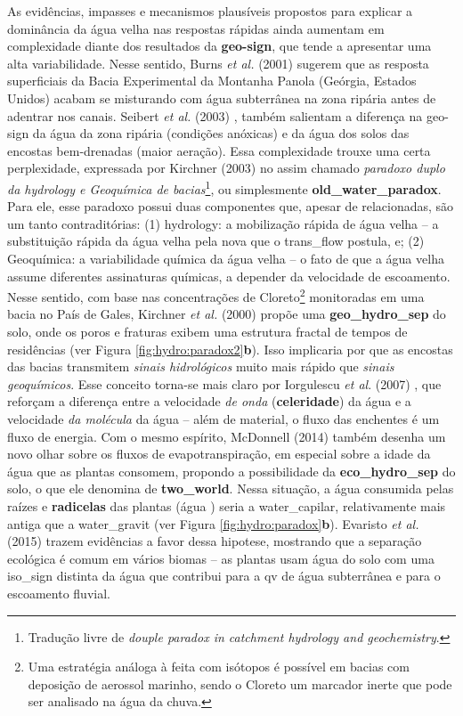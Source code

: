 \documentclass[./main.tex]{subfiles}
\begin{document}
\par As evidências, impasses e mecanismos plausíveis propostos para explicar a dominância da água velha nas respostas rápidas ainda aumentam em complexidade diante dos resultados da \textbf{\gls{geo-sign}}, que tende a apresentar uma alta variabilidade. Nesse sentido, Burns \textit{et al.} (2001) \cite{burns2001quantifying} sugerem que as resposta superficiais da Bacia Experimental da Montanha Panola (Geórgia, Estados Unidos) acabam se misturando com água subterrânea na zona ripária antes de adentrar nos canais. Seibert \textit{et al.} (2003) \cite{seibert2003groundwater}, também salientam a diferença na \gls{geo-sign} da água da zona ripária (condições anóxicas) e da água dos solos das encostas bem-drenadas (maior aeração). Essa complexidade trouxe uma certa perplexidade, expressada por Kirchner (2003) \cite{Kirchner2003} no assim chamado \textit{paradoxo duplo da \gls{hydrology} e Geoquímica de bacias}\footnote{Tradução livre de \textit{douple paradox in catchment hydrology and geochemistry}.}, ou simplesmente \textbf{\gls{old_water_paradox}}. Para ele, esse paradoxo possui duas componentes que, apesar de relacionadas, são um tanto contraditórias: (1) \gls{hydrology}: a mobilização rápida de água velha -- a substituição rápida da água velha pela nova que o \gls{trans_flow} postula, e; (2) Geoquímica: a variabilidade química da água velha -- o fato de que a água velha assume diferentes assinaturas químicas, a depender da velocidade de escoamento. Nesse sentido, com base nas concentrações de Cloreto\footnote{Uma estratégia análoga à feita com isótopos é possível em bacias com deposição de aerossol marinho, sendo o Cloreto um marcador inerte que pode ser analisado na água da chuva.} monitoradas em uma bacia no País de Gales, Kirchner \textit{et al.} (2000) \cite{kirchner2000} propõe uma \textbf{\gls{geo_hydro_sep}} do solo, onde os poros e fraturas exibem uma estrutura fractal de tempos de residências (ver Figura \ref{fig:hydro:paradox2}\textbf{b}). Isso implicaria por que as encostas das bacias transmitem \textit{sinais hidrológicos} muito mais rápido que \textit{sinais geoquímicos}. Esse conceito torna-se mais claro por Iorgulescu \textit{et al}. (2007) \cite{Iorgulescu2007}, que reforçam a diferença entre a velocidade \textit{de onda} (\textbf{celeridade}) da água e a velocidade \textit{da molécula} da água -- além de material, o fluxo das enchentes é um fluxo de energia. Com o mesmo espírito, McDonnell (2014) \cite{mcdonnell2014} também desenha um novo olhar sobre os fluxos de evapotranspiração, em especial sobre a idade da água que as plantas consomem, propondo a possibilidade da \textbf{\gls{eco_hydro_sep}} do solo, o que ele denomina de \textbf{\gls{two_world}}. Nessa situação, a água consumida pelas raízes e \textbf{radicelas} das plantas (água ) seria a \gls{water_capilar}, relativamente mais antiga que a \gls{water_gravit} (ver Figura \ref{fig:hydro:paradox}\textbf{b}). Evaristo \textit{et al.} (2015) \cite{Evaristo2015} trazem evidências a favor dessa \gls{hipotese}, mostrando que a separação ecológica é comum em vários biomas -- as plantas usam água do solo com uma \gls{iso_sign} distinta da água que contribui para a \gls{qv} de água subterrânea e para o escoamento fluvial.
\end{document}
